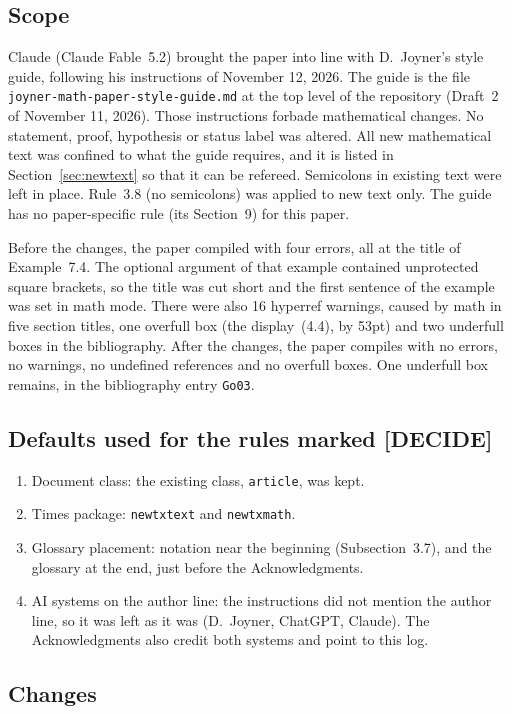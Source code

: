 \documentclass[12pt,letterpaper]{article}
\begin{document}
\subsection{Scope}
Claude (Claude Fable~5.2) brought the paper into line with D.~Joyner's style
guide, following his instructions of November 12, 2026. The guide is the file
\texttt{joyner-math-paper-style-guide.md} at the top level of the repository
(Draft~2 of November 11, 2026). Those instructions forbade
mathematical changes. No statement, proof, hypothesis or status label was altered.
All new mathematical text was confined to what the guide requires, and it is
listed in Section~\ref{sec:newtext} so that it can be refereed. Semicolons in
existing text were left in place. Rule~3.8 (no semicolons) was applied to new
text only. The guide has no paper-specific rule (its Section~9) for this paper.

Before the changes, the paper compiled with four errors, all at the title of
Example~7.4. The optional argument of that example contained unprotected square
brackets, so the title was cut short and the first sentence of the example was set
in math mode. There were also 16 hyperref warnings, caused by math in five section
titles, one overfull box (the display~(4.4), by 53pt) and two underfull boxes in
the bibliography. After the changes, the paper compiles with no errors, no
warnings, no undefined references and no overfull boxes. One underfull box remains,
in the bibliography entry \texttt{Go03}.

\subsection{Defaults used for the rules marked [DECIDE]}
\begin{enumerate}
\item Document class: the existing class, \texttt{article}, was kept.
\item Times package: \texttt{newtxtext} and \texttt{newtxmath}.
\item Glossary placement: notation near the beginning (Subsection~3.7), and the
glossary at the end, just before the Acknowledgments.
\item AI systems on the author line: the instructions did not mention the author
line, so it was left as it was (D.~Joyner, ChatGPT, Claude). The Acknowledgments
also credit both systems and point to this log.
\end{enumerate}

\subsection{Changes}
\end{document}
